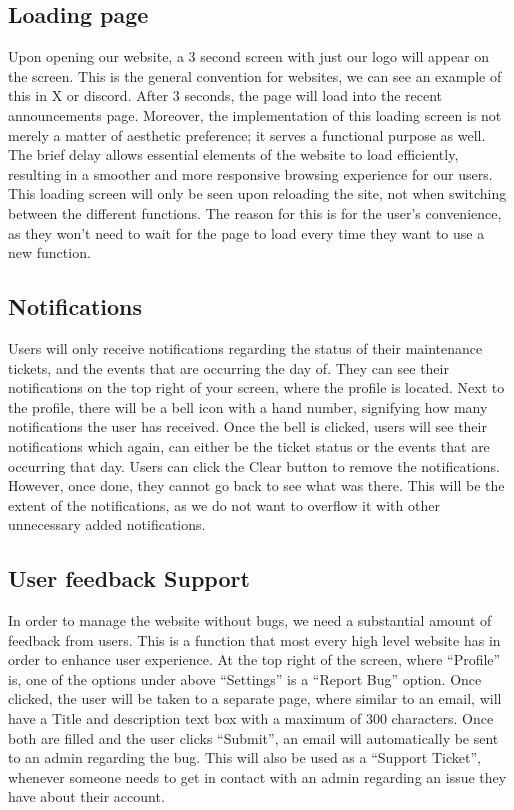 \documentclass[conference]{IEEEtran}
\begin{document}
\subsection{Loading page}
Upon opening our website, a 3 second screen with just our logo will appear on the screen. This is the general convention for websites, we can see an example of this in X or discord. After 3 seconds, the page will load into the recent announcements page. Moreover, the implementation of this loading screen is not merely a matter of aesthetic preference; it serves a functional purpose as well. The brief delay allows essential elements of the website to load efficiently, resulting in a smoother and more responsive browsing experience for our users. This loading screen will only be seen upon reloading the site, not when switching between the different functions. The reason for this is for the user's convenience, as they won’t need to wait for the page to load every time they want to use a new function.
\subsection{Notifications}
Users will only receive notifications regarding the status of their maintenance tickets, and the events that are occurring the day of. They can see their notifications on the top right of your screen, where the profile is located. Next to the profile, there will be a bell icon with a hand number, signifying how many notifications the user has received. Once the bell is clicked, users will see their notifications which again, can either be the ticket status or the events that are occurring that day. Users can click the Clear button to remove the notifications. However, once done, they cannot go back to see what was there. This will be the extent of the notifications, as we do not want to overflow it with other unnecessary added notifications.
\subsection{User feedback Support}
In order to manage the website without bugs, we need a substantial amount of feedback from users. This is a function that most every high level website has in order to enhance user experience. At the top right of the screen, where “Profile” is, one of the options under above “Settings” is a “Report Bug” option. Once clicked, the user will be taken to a separate page, where similar to an email, will have a Title and description text box with a maximum of 300 characters. Once both are filled and the user clicks “Submit”, an email will automatically be sent to an admin regarding the bug. This will also be used as a “Support Ticket”, whenever someone needs to get in contact with an admin regarding an issue they have about their account.
\end{document}
